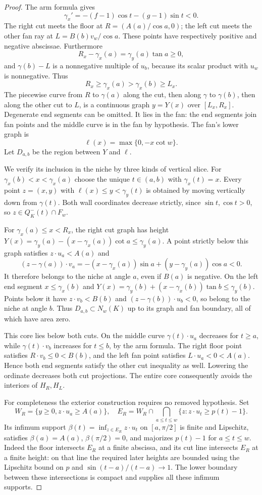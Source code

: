 \documentclass[11pt]{article}
\begin{document}
\begin{proof}
The arm formula gives
\[
 \gamma_x'=-(f-1)\cos t-(g-1)\sin t<0.
\]
The right cut meets the floor at $R=(A(a)/\cos a,0)$; the left cut meets the other fan ray at $L=B(b)v_w/\cos a$. These points have respectively positive and negative abscissae. Furthermore
\[
 R_x-\gamma_x(a)=\gamma_y(a)\tan a\ge0,
\]
and $\gamma(b)-L$ is a nonnegative multiple of $u_b$, because its scalar product with $u_w$ is nonnegative. Thus
\[
 R_x\ge\gamma_x(a)>\gamma_x(b)\ge L_x.
\]
The piecewise curve from $R$ to $\gamma(a)$ along the cut, then along $\gamma$ to $\gamma(b)$, then along the other cut to $L$, is a continuous graph $y=Y(x)$ over $[L_x,R_x]$. Degenerate end segments can be omitted. It lies in the fan: the end segments join fan points and the middle curve is in the fan by hypothesis. The fan's lower graph is
\[
 \ell(x)=\max\{0,-x\cot w\}.
\]
Let $D_{a,b}$ be the region between $Y$ and $\ell$.

We verify its inclusion in the niche by three kinds of vertical slice. For $\gamma_x(b)<x<\gamma_x(a)$ choose the unique $t\in(a,b)$ with $\gamma_x(t)=x$. Every point $z=(x,y)$ with $\ell(x)\le y<\gamma_y(t)$ is obtained by moving vertically down from $\gamma(t)$. Both wall coordinates decrease strictly, since $\sin t,\cos t>0$, so $z\in Q^-_K(t)\cap F_w$.

For $\gamma_x(a)\le x<R_x$, the right cut graph has height
$Y(x)=\gamma_y(a)-(x-\gamma_x(a))\cot a\le\gamma_y(a)$.
A point strictly below this graph satisfies $z\cdot u_a<A(a)$ and
\[
 (z-\gamma(a))\cdot v_a
 =-(x-\gamma_x(a))\sin a+(y-\gamma_y(a))\cos a<0.
\]
It therefore belongs to the niche at angle $a$, even if $B(a)$ is negative. On the left end segment $x\le\gamma_x(b)$ and
$Y(x)=\gamma_y(b)+(x-\gamma_x(b))\tan b\le\gamma_y(b)$.
Points below it have $z\cdot v_b<B(b)$ and $(z-\gamma(b))\cdot u_b<0$, so belong to the niche at angle $b$. Thus $D_{a,b}\subset N_w(K)$ up to its graph and fan boundary, all of which have area zero.

This core lies below both cuts. On the middle curve $\gamma(t)\cdot u_a$ decreases for $t\ge a$, while $\gamma(t)\cdot v_b$ increases for $t\le b$, by the arm formula. The right floor point satisfies $R\cdot v_b\le0<B(b)$, and the left fan point satisfies $L\cdot u_a<0<A(a)$. Hence both end segments satisfy the other cut inequality as well. Lowering the ordinate decreases both cut projections. The entire core consequently avoids the interiors of $H_R,H_L$.

For completeness the exterior construction requires no removed hypothesis. Set
\[
 W_R=\{y\ge0,z\cdot u_a\ge A(a)\},\quad
 E_R=W_R\cap\bigcap_{a\le t\le w}\{z:z\cdot u_t\ge p(t)-1\}.
\]
Its infimum support $\beta(t)=\inf_{z\in E_R}z\cdot u_t$ on $[a,\pi/2]$ is finite and Lipschitz, satisfies $\beta(a)=A(a)$, $\beta(\pi/2)=0$, and majorizes $p(t)-1$ for $a\le t\le w$. Indeed the floor intersects $E_R$ at a finite abscissa, and its cut line intersects $E_R$ at a finite height: on that line the required later heights are bounded using the Lipschitz bound on $p$ and $\sin(t-a)/(t-a)\to1$. The lower boundary between these intersections is compact and supplies all these infimum supports.


\end{proof}
\end{document}
